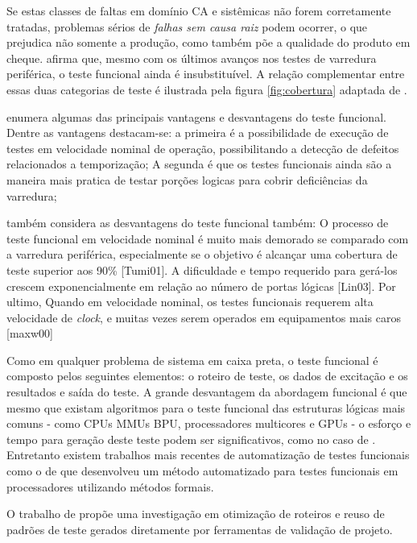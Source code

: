 Se estas classes de faltas em domínio CA e sistêmicas não forem corretamente tratadas, problemas sérios de \textit{falhas sem causa raiz} podem ocorrer, o que prejudica não somente a produção, como também põe a qualidade do produto em cheque. \citet{tumim2001} afirma que, mesmo com os últimos avanços nos testes de varredura periférica, o teste funcional ainda é insubstituível. A relação complementar entre essas duas categorias de teste é ilustrada pela figura \ref{fig:cobertura} adaptada de \citet{thomaswenzelenricozimmermann2016}. 

\citet{thibeault2006} enumera algumas das  principais vantagens e desvantagens do teste funcional. Dentre as vantagens destacam-se: a primeira é a possibilidade de execução de testes em velocidade nominal de operação, possibilitando a detecção de defeitos relacionados a temporização; A segunda é que os testes funcionais ainda são a maneira mais pratica de testar porções logicas para cobrir deficiências da varredura;

\citet{thibeault2006} também considera as desvantagens do teste funcional também:  O processo de teste funcional em velocidade nominal é muito mais demorado se comparado com a varredura periférica, especialmente se o objetivo é alcançar uma cobertura de teste superior aos 90\% [Tumi01]. A dificuldade e tempo requerido para gerá-los crescem exponencialmente em relação ao número de portas lógicas [Lin03].
 Por ultimo, Quando em velocidade nominal, os testes funcionais requerem alta velocidade de \textit{clock}, e muitas vezes serem operados em equipamentos mais caros [maxw00] 


Como em qualquer problema de sistema em caixa preta, o teste funcional é composto pelos seguintes elementos: o roteiro de teste, os dados de excitação e os resultados e saída do teste.  A grande desvantagem da abordagem funcional é que mesmo que existam algoritmos para o teste funcional das estruturas lógicas mais comuns - como CPUs MMUs BPU, processadores multicores e GPUs - o esforço e tempo para geração deste teste podem ser significativos, como no caso de \citet{tumim2001}. Entretanto existem trabalhos mais recentes de automatização de testes funcionais como o de \citet{riefert2014effective} que desenvolveu um método automatizado para testes funcionais em processadores utilizando métodos formais.

O trabalho de \citet{thibeault2006} propõe uma investigação em otimização de roteiros e reuso de padrões de teste gerados diretamente por ferramentas de validação de projeto.


